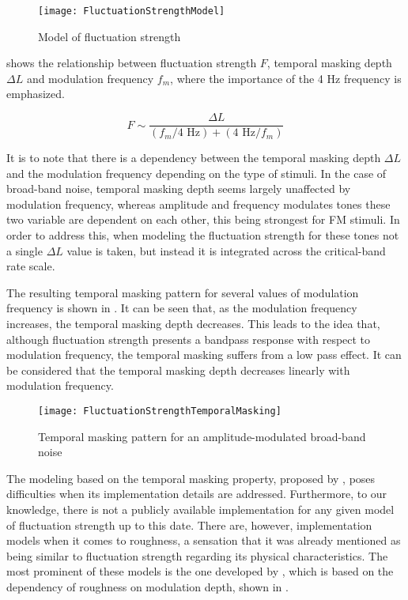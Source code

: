 \documentclass[../main.tex]{subfiles}
\begin{document}
\begin{theoreticalbackground}
\begin{figure}[!ht]
  \centering
  \texttt{[image: FluctuationStrengthModel]}
  \caption{Model of fluctuation
    strength~\cite[pp. 254]{Fastl2007Psychoacoustics}}
\label{fig:flucstrenmodel}
\end{figure}

 shows the relationship between fluctuation
strength $F$, temporal masking depth $\Delta L$ and modulation frequency
$f_{m}$, where the importance of the 4 Hz frequency is emphasized.

\begin{equation}
  F \sim \frac{\Delta L}{(f_{m}/4\text{ Hz}) + (4\text{ Hz}/f_{m})}
  \label{eq:flucstrentempmaskmodfreq}
\end{equation}

It is to note that there is a dependency between the temporal masking depth
$\Delta L$ and the modulation frequency depending on the type of stimuli. In the
case of broad-band noise, temporal masking depth seems largely unaffected by
modulation frequency, whereas amplitude and frequency modulates tones these two
variable are dependent on each other, this being strongest for \gls{FM} stimuli.
In order to address this, when modeling the fluctuation strength for these tones
not a single $\Delta L$ value is taken, but instead it is integrated across the
critical-band rate scale.

The resulting temporal masking pattern for several values of modulation
frequency is shown in . It can be seen that, as the
modulation frequency increases, the temporal masking depth decreases. This leads
to the idea that, although fluctuation strength presents a bandpass response
with respect to modulation frequency, the temporal masking suffers from a low
pass effect. It can be considered that the temporal masking depth decreases
linearly with modulation frequency.

\begin{figure}[!ht]
  \centering
  \texttt{[image: FluctuationStrengthTemporalMasking]}
  \caption{Temporal masking pattern for an amplitude-modulated broad-band
    noise~\cite[pp. 255]{Fastl2007Psychoacoustics}}
\label{fig:flucstrenmasking}
\end{figure}

The modeling based on the temporal masking property, proposed by
\citeauthor{Fastl2007Psychoacoustics}, poses difficulties when its
implementation details are addressed. Furthermore, to our knowledge, there is
not a publicly available implementation for any given model of fluctuation
strength up to this date. There are, however, implementation models when it
comes to roughness, a sensation that it was already mentioned as being similar
to fluctuation strength regarding its physical characteristics. The most
prominent of these models is the one developed by
\textcite{daniel1997psychoacoustical}, which is based on the dependency of
roughness on modulation depth, shown in .


\end{theoreticalbackground}
\end{document}
